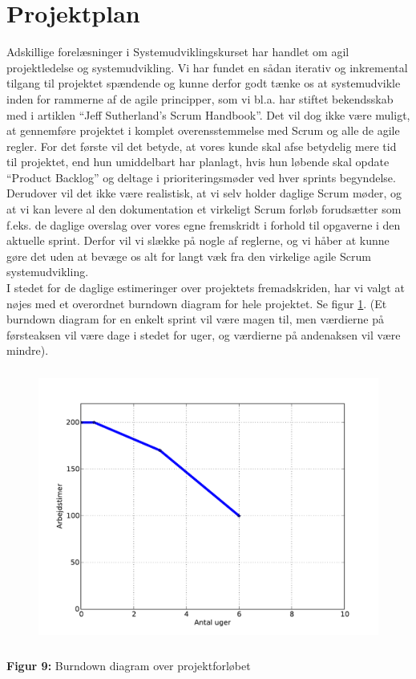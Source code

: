 \documentclass[12pt]{article}   %
\begin{document}
\section{Projektplan}
Adskillige forelæsninger i Systemudviklingskurset har handlet om agil projektledelse og systemudvikling. Vi har fundet en sådan iterativ og inkremental tilgang til projektet spændende og kunne derfor godt tænke os at systemudvikle inden for rammerne af de agile principper, som vi bl.a. har 
stiftet bekendsskab med i artiklen ``Jeff Sutherland's Scrum
Handbook''\cite{scrum}. Det vil dog ikke være muligt, at gennemføre projektet i komplet overensstemmelse med Scrum og alle de agile regler. For det første vil det betyde, at vores kunde skal afse betydelig mere tid til projektet, end hun umiddelbart har planlagt, hvis hun løbende skal opdate ``Product Backlog'' og deltage i prioriteringsmøder ved hver sprints begyndelse. Derudover vil det ikke være realistisk, at vi selv holder daglige Scrum møder,
og at vi kan levere al den dokumentation et virkeligt Scrum forløb forudsætter som f.eks. de daglige overslag over vores egne fremskridt i forhold til opgaverne i den aktuelle sprint. Derfor vil vi slække på nogle af 
reglerne, og vi håber at kunne gøre det uden at bevæge os alt for langt væk fra den virkelige agile Scrum systemudvikling.\\
I stedet for de daglige estimeringer over projektets fremadskriden, har vi valgt at nøjes med et overordnet burndown diagram for hele projektet. Se figur
\ref{fig:bd}. (Et burndown diagram for en enkelt sprint vil være magen til, men værdierne på førsteaksen vil være dage i stedet for uger, og værdierne på
andenaksen vil være mindre). 

\begin{figure}[!ht]
	\centering
\includegraphics[width=13cm, height=9cm]{burn.pdf}
\label{fig:bd}
\end{figure}
\begin{center}
\textbf{Figur 9:} Burndown diagram over projektforløbet
\end{center}
\end{document}
